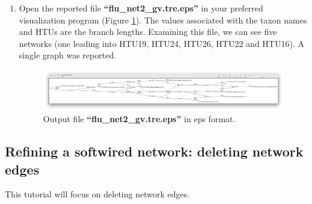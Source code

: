 \documentclass[11pt]{article}
\begin{document}
\begin {enumerate}
\item  Open the reported file \textbf{``flu\_net2\_gv.tre.eps''}  in your preferred
visualization program (Figure \ref{eps2}). The values associated with the taxon 
names and HTUs are the branch lengths. Examining this file, we can see five 
networks (one leading into HTU19, HTU24, HTU26, HTU22 and HTU16). A single
graph was reported.

\begin{figure}[H]
\centering
\includegraphics[width=\textwidth]{eps2.png}
\caption{Output file \textbf{``flu\_net2\_gv.tre.eps''} in eps format.}
\label{eps2}
\end{figure}

\end{enumerate}

\subsection{Refining a softwired network: deleting network edges}
\label{subsec:netdel}

This tutorial will focus on deleting network edges.
\end{document}
